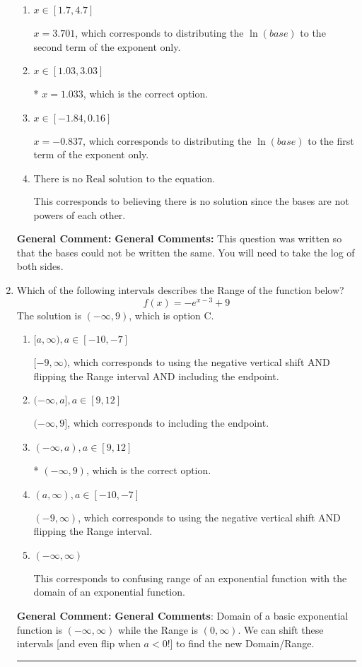 \documentclass{extbook}[14pt]
\newcommand{\litem}[1]{\item #1

\rule{\textwidth}{0.4pt}}
\begin{document}
\begin{enumerate}
{\begin{enumerate}[label=\Alph*.]
$x = -3.000$, which corresponds to solving the numerators as equal while ignoring the bases are different.
\item \( x \in [1.7, 4.7] \)

$x = 3.701$, which corresponds to distributing the $\ln(base)$ to the second term of the exponent only.
\item \( x \in [1.03, 3.03] \)

* $x = 1.033$, which is the correct option.
\item \( x \in [-1.84, 0.16] \)

$x = -0.837$, which corresponds to distributing the $\ln(base)$ to the first term of the exponent only.
\item \( \text{There is no Real solution to the equation.} \)

This corresponds to believing there is no solution since the bases are not powers of each other.
\end{enumerate}

\textbf{General Comment:} \textbf{General Comments:} This question was written so that the bases could not be written the same. You will need to take the log of both sides.
}
\litem{
Which of the following intervals describes the Range of the function below?
\[ f(x) = -e^{x-3}+9 \]The solution is \( (-\infty, 9) \), which is option C.\begin{enumerate}[label=\Alph*.]
\item \( [a, \infty), a \in [-10, -7] \)

$[-9, \infty)$, which corresponds to using the negative vertical shift AND flipping the Range interval AND including the endpoint.
\item \( (-\infty, a], a \in [9, 12] \)

$(-\infty, 9]$, which corresponds to including the endpoint.
\item \( (-\infty, a), a \in [9, 12] \)

* $(-\infty, 9)$, which is the correct option.
\item \( (a, \infty), a \in [-10, -7] \)

$(-9, \infty)$, which corresponds to using the negative vertical shift AND flipping the Range interval.
\item \( (-\infty, \infty) \)

This corresponds to confusing range of an exponential function with the domain of an exponential function.
\end{enumerate}

\textbf{General Comment:} \textbf{General Comments}: Domain of a basic exponential function is $(-\infty, \infty)$ while the Range is $(0, \infty)$. We can shift these intervals [and even flip when $a<0$!] to find the new Domain/Range.
}
\end{enumerate}
\end{document}
